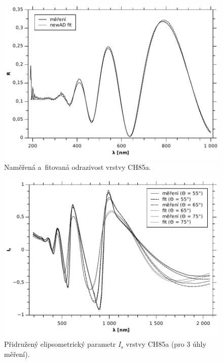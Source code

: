 \documentclass[12pt]{article}
\begin{document}
\begin{figure}
  \centering
  \includegraphics[width=135mm]{img/CH85-R.pdf}
  \caption{Naměřená a~fitovaná odrazivost vrstvy CH85a.}
  \label{CH85R}
\end{figure}

\begin{figure}
  \centering
  \includegraphics[width=135mm]{img/CH85-is1.pdf}
  \caption{Přidružený elipsometrický parametr $I_\mathrm{s}$ vrstvy CH85a (pro 3 úhly měření).}
  \label{CH85is}
\end{figure}
\end{document}
